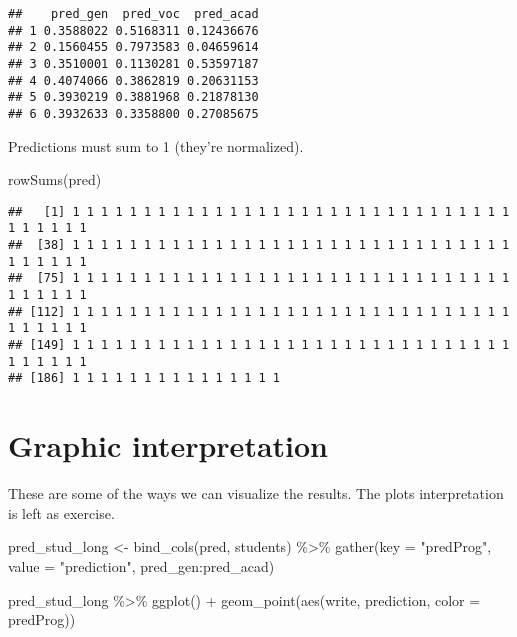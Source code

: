 \documentclass[
  oneside]{book}
\newenvironment{Shaded}{\begin{snugshade}}{\end{snugshade}}
\newcommand{\AttributeTok}[1]{\textcolor[rgb]{0.77,0.63,0.00}{#1}}
\newcommand{\FunctionTok}[1]{\textcolor[rgb]{0.00,0.00,0.00}{#1}}
\newcommand{\NormalTok}[1]{#1}
\newcommand{\OtherTok}[1]{\textcolor[rgb]{0.56,0.35,0.01}{#1}}
\newcommand{\SpecialCharTok}[1]{\textcolor[rgb]{0.00,0.00,0.00}{#1}}
\newcommand{\StringTok}[1]{\textcolor[rgb]{0.31,0.60,0.02}{#1}}
\begin{document}
\begin{verbatim}
##    pred_gen  pred_voc  pred_acad
## 1 0.3588022 0.5168311 0.12436676
## 2 0.1560455 0.7973583 0.04659614
## 3 0.3510001 0.1130281 0.53597187
## 4 0.4074066 0.3862819 0.20631153
## 5 0.3930219 0.3881968 0.21878130
## 6 0.3932633 0.3358800 0.27085675
\end{verbatim}

Predictions must sum to 1 (they're normalized).

\begin{Shaded}
\begin{Highlighting}[]
\FunctionTok{rowSums}\NormalTok{(pred)}
\end{Highlighting}
\end{Shaded}

\begin{verbatim}
##   [1] 1 1 1 1 1 1 1 1 1 1 1 1 1 1 1 1 1 1 1 1 1 1 1 1 1 1 1 1 1 1 1 1 1 1 1 1 1
##  [38] 1 1 1 1 1 1 1 1 1 1 1 1 1 1 1 1 1 1 1 1 1 1 1 1 1 1 1 1 1 1 1 1 1 1 1 1 1
##  [75] 1 1 1 1 1 1 1 1 1 1 1 1 1 1 1 1 1 1 1 1 1 1 1 1 1 1 1 1 1 1 1 1 1 1 1 1 1
## [112] 1 1 1 1 1 1 1 1 1 1 1 1 1 1 1 1 1 1 1 1 1 1 1 1 1 1 1 1 1 1 1 1 1 1 1 1 1
## [149] 1 1 1 1 1 1 1 1 1 1 1 1 1 1 1 1 1 1 1 1 1 1 1 1 1 1 1 1 1 1 1 1 1 1 1 1 1
## [186] 1 1 1 1 1 1 1 1 1 1 1 1 1 1 1
\end{verbatim}

\hypertarget{graphic-interpretation}{%
\section{Graphic interpretation}\label{graphic-interpretation}}

These are some of the ways we can visualize the results.
The plots interpretation is left as exercise.

\begin{Shaded}
\begin{Highlighting}[]
\NormalTok{pred\_stud\_long }\OtherTok{\textless{}{-}} \FunctionTok{bind\_cols}\NormalTok{(pred, students) }\SpecialCharTok{\%\textgreater{}\%}
  \FunctionTok{gather}\NormalTok{(}\AttributeTok{key =} \StringTok{"predProg"}\NormalTok{, }\AttributeTok{value =} \StringTok{"prediction"}\NormalTok{, pred\_gen}\SpecialCharTok{:}\NormalTok{pred\_acad)}

\NormalTok{pred\_stud\_long }\SpecialCharTok{\%\textgreater{}\%}
  \FunctionTok{ggplot}\NormalTok{() }\SpecialCharTok{+}
  \FunctionTok{geom\_point}\NormalTok{(}\FunctionTok{aes}\NormalTok{(write, prediction, }\AttributeTok{color =}\NormalTok{ predProg))}
\end{Highlighting}
\end{Shaded}
\end{document}
